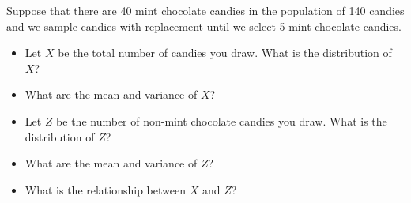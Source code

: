 \begin{frame}

Suppose that there are 40 mint chocolate candies in the population of 140 candies and we sample candies with replacement until we select 5 mint chocolate candies.

\begin{itemize}
\item Let $X$ be the total number of candies you draw. What is the distribution of $X$?
\item What are the mean and variance of $X$?
\item Let $Z$ be the number of non-mint chocolate candies you draw. What is the distribution of $Z$?
\item What are the mean and variance of $Z$?
\item What is the relationship between $X$ and $Z$?
\end{itemize}
\end{frame}



